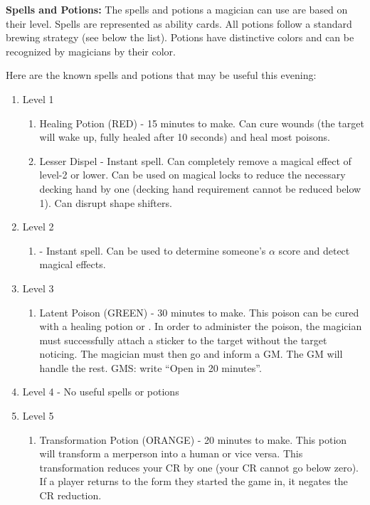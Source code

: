 \documentclass[blue]{NeptuneBall}
\begin{document}
\name{\bGMPotions{}}

{\bf Spells and Potions:}
The spells and potions a magician can use are based on their level. Spells are represented as ability cards. All potions follow a standard brewing strategy (see below the list). Potions have distinctive colors and can be recognized by magicians by their color. 

Here are the known spells and potions that may be useful this evening:
\begin{enumerate}
  \item Level 1
   \begin{enumerate}
     \item Healing Potion (RED) - 15 minutes to make. Can cure wounds (the target will wake up, fully healed after 10 seconds) and heal most poisons. 
     \item Lesser Dispel - Instant spell. Can completely remove a magical effect of level-2 or lower. Can be used on magical locks to reduce the necessary decking hand by one (decking hand requirement cannot be reduced below 1). Can disrupt shape shifters.
   \end{enumerate}
  \item Level 2
   \begin{enumerate}
     \item \aPerceive{} - Instant spell. Can be used to determine someone's $\alpha$ score and detect magical effects.
   \end{enumerate}
  \item Level 3
     \begin{enumerate}
     \item Latent Poison (GREEN) - 30 minutes to make. This poison can be cured with a healing potion or \aFirstAid{}. In order to administer the poison, the magician must successfully attach a sticker to the target without the target noticing. The magician must then go and inform a GM. The GM will handle the rest. GMS: write ``Open in 20 minutes''.
   \end{enumerate}
   \item Level 4 - No useful spells or potions
   \item Level 5
    \begin{enumerate}
     \item Transformation Potion (ORANGE) - 20 minutes to make. This potion will transform a merperson into a human or vice versa. This transformation reduces your CR by one (your CR cannot go below zero). If a player returns to the form they started the game in, it negates the CR reduction.

\end{enumerate}
\end{enumerate}
\end{document}
